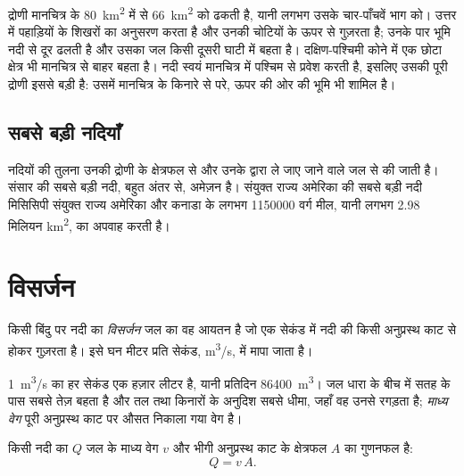 द्रोणी मानचित्र के \qty{80}{km^2} में से \qty{66}{km^2} को ढकती है, यानी लगभग
उसके चार-पाँचवें भाग को। उत्तर में  पहाड़ियों के शिखरों का अनुसरण करता है
और उनकी चोटियों के ऊपर से गुज़रता है; उनके पार भूमि नदी से दूर ढलती है और उसका
जल किसी दूसरी घाटी में बहता है। दक्षिण-पश्चिमी कोने में एक छोटा क्षेत्र भी
मानचित्र से बाहर बहता है। नदी स्वयं मानचित्र में पश्चिम से प्रवेश करती है, इसलिए उसकी
पूरी द्रोणी इससे बड़ी है: उसमें मानचित्र के किनारे से परे, ऊपर की ओर की
भूमि भी शामिल है।

\subsection*{सबसे बड़ी नदियाँ}

नदियों की तुलना उनकी द्रोणी के क्षेत्रफल से और उनके द्वारा ले जाए जाने वाले जल से की जाती है।
संसार की सबसे बड़ी नदी, बहुत अंतर से, अमेज़न है। संयुक्त राज्य अमेरिका की सबसे बड़ी नदी
मिसिसिपी संयुक्त राज्य अमेरिका और कनाडा के लगभग \num{1150000} वर्ग मील,
यानी लगभग 2.98 मिलियन \unit{km^2}, का अपवाह करती है।

\section{विसर्जन}

\begin{definition}[विसर्जन]\label{def:g10:drainage-basins:discharge}
किसी बिंदु पर नदी का \emph{विसर्जन} जल का वह आयतन है जो एक सेकंड में
नदी की किसी अनुप्रस्थ काट से होकर गुज़रता है। इसे
घन मीटर प्रति सेकंड, \unit{m^3/s}, में मापा जाता है।
\end{definition}

\qty{1}{m^3/s} का  हर सेकंड एक हज़ार लीटर है, यानी
प्रतिदिन \qty{86400}{m^3}। जल धारा के बीच में सतह के पास सबसे तेज़
बहता है और तल तथा किनारों के अनुदिश सबसे धीमा, जहाँ वह उनसे
रगड़ता है; \emph{माध्य वेग} पूरी अनुप्रस्थ काट पर औसत निकाला गया
वेग है।

\begin{proposition}[विसर्जन, वेग और अनुप्रस्थ काट]\label{prop:g10:drainage-basins:discharge}
किसी नदी का  $Q$ जल के माध्य वेग $v$ और
भीगी अनुप्रस्थ काट के क्षेत्रफल $A$ का गुणनफल है:
\[
Q = v\,A.
\]
\end{proposition}

